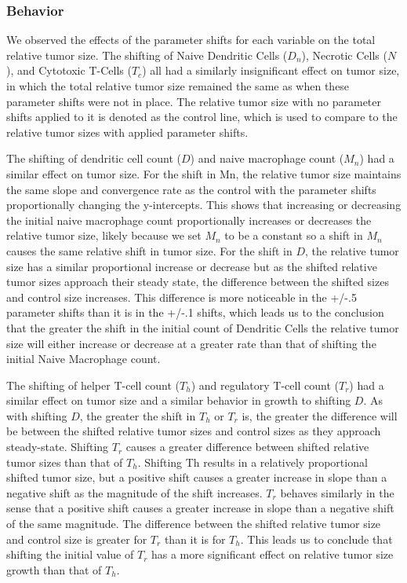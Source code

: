 \documentclass{article}
\begin{document}
\newpage

\subsubsection{Behavior}
We observed the effects of the parameter shifts for each variable on the total relative tumor size. The shifting of Naive Dendritic Cells ($D_n$), Necrotic Cells ($N$), and Cytotoxic T-Cells ($T_c$) all had a similarly insignificant effect on tumor size, in which the total relative tumor size remained the same as when these parameter shifts were not in place. The relative tumor size with no parameter shifts applied to it is denoted as the control line, which is used to compare to the relative tumor sizes with applied parameter shifts.

The shifting of dendritic cell count ($D$) and naive macrophage count ($M_n$) had a similar effect on tumor size. For the shift in Mn, the relative tumor size maintains the same slope and convergence rate as the control with the parameter shifts proportionally changing the y-intercepts. This shows that increasing or decreasing the initial naive macrophage count proportionally increases or decreases the relative tumor size, likely because we set $M_n$ to be a constant so a shift in $M_n$ causes the same relative shift in tumor size. For the shift in $D$, the relative tumor size has a similar proportional increase or decrease but as the shifted relative tumor sizes approach their steady state, the difference between the shifted sizes and control size increases. This difference is more noticeable in the +/-.5 parameter shifts than it is in the +/-.1 shifts, which leads us to the conclusion that the greater the shift in the initial count of Dendritic Cells the relative tumor size will either increase or decrease at a greater rate than that of shifting the initial Naive Macrophage count.

The shifting of helper T-cell count ($T_h$) and regulatory T-cell count ($T_r$) had a similar effect on tumor size and a similar behavior in growth to shifting $D$. As with shifting $D$, the greater the shift in $T_h$ or $T_r$ is, the greater the difference will be between the shifted relative tumor sizes and control sizes as they approach steady-state. Shifting $T_r$ causes a greater difference between shifted relative tumor sizes than that of $T_h$. Shifting Th results in a relatively proportional shifted tumor size, but a positive shift causes a greater increase in slope than a negative shift as the magnitude of the shift increases. $T_r$ behaves similarly in the sense that a positive shift causes a greater increase in slope than a negative shift of the same magnitude. The difference between the shifted relative tumor size and control size is greater for $T_r$ than it is for $T_h$. This leads us to conclude that shifting the initial value of $T_r$ has a more significant effect on relative tumor size growth than that of $T_h$.
\end{document}
